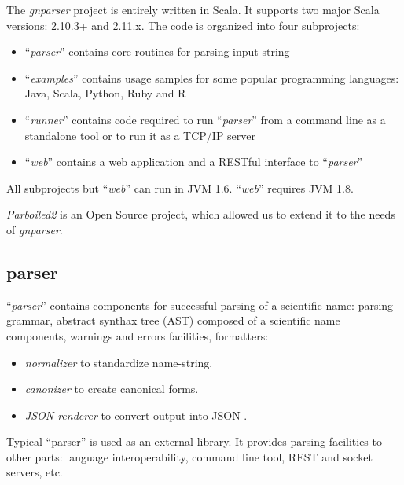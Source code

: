 \documentclass{bmcart}
\newcommand{\comment}[2]{\hspace{0in}#2}
\begin{document}
The \textit{gnparser} project is entirely written in Scala. It supports two
major Scala versions: 2.10.3+ and 2.11.x. The code is organized into four
subprojects:

\begin{itemize}
  \item ``\textit{parser}'' contains core routines for parsing input string
  \item ``\textit{examples}'' contains usage samples for some popular
  programming languages: Java, Scala, Python, Ruby and R
  \item ``\textit{runner}'' contains code required to run ``\textit{parser}''
  from a command line as a standalone tool or to run it as a TCP/IP server
  \item ``\textit{web}'' contains a web application and a RESTful interface to
  ``\textit{parser}''
\end{itemize}

All subprojects but ``\textit{web}'' can run in JVM 1.6. ``\textit{web}''
requires JVM 1.8.

\textit{Parboiled2} is an Open Source project, which allowed us to extend
\comment{dima: would be good to add a few sentences to describe the extensions}
it to the needs of \textit{gnparser}.

\subsection*{parser}

``\textit{parser}'' contains components for successful parsing of a scientific
name: parsing grammar, abstract synthax tree (AST) composed of a scientific
name components, warnings and errors facilities, formatters:

\begin{itemize}

  \item \textit{normalizer} to standardize name-string.

  \item \textit{canonizer} to create canonical forms.

  \item \textit{JSON renderer} to convert output into JSON
    \cite{bray2014javascript}.

\end{itemize}

Typical ``parser'' is used as an external library. It provides parsing
facilities to other parts: language interoperability, command line tool, REST
and socket servers, etc.
\end{document}
